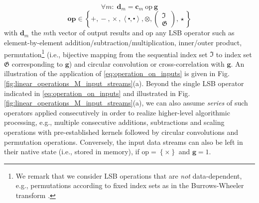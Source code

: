 \documentclass[twocolumn,english,onecolumn]{IEEEtran}
\theoremstyle{plain}
\theoremstyle{plain}
\begin{document}
\[
\forall m:\;\mathbf{d}_{m}=\mathbf{c}_{m}\:\text{op}\:\mathbf{g}
\]
\begin{equation}
\mathbf{\text{op}\in\left\{ +\mathrm{,}-\mathrm{,}\times\mathrm{,}\left\langle \centerdot,\centerdot\right\rangle ,\otimes\mathrm{,}\left(\begin{array}{c}
\mathfrak{I}\\
\mathfrak{G}
\end{array}\right)\mathrm{,}\star\right\} }\label{eq:operation_on_inputs}
\end{equation}
with $\mathbf{d}_{m}$ the $m$th vector of output results and $\text{op}$
any LSB operator such as element-by-element addition/subtraction/multiplication,
inner/outer product, permutation\footnote{We remark that we consider LSB operations that are \emph{not} data-dependent,
e.g., permutations according to fixed index sets as in the Burrows-Wheeler
transform \cite{fenwick1996burrows,ko2007parameterized}. } (i.e., bijective mapping from the sequential index set $\mathbf{\mathfrak{I}}$
to index set $\mathbf{\mathfrak{G}}$ corresponding to $\mathbf{g}$)
and circular convolution or cross-correlation with $\mathbf{g}$.
An illustration of the application of \eqref{eq:operation_on_inputs}
is given in Fig. \ref{fig:linear_operations_M_input_streams}(a).
Beyond the single LSB operator indicated in \eqref{eq:operation_on_inputs}
and illustrated in Fig. \ref{fig:linear_operations_M_input_streams}(a),
we can also assume\emph{ series} of such operators applied consecutively
in order to realize higher-level algorithmic processing, e.g., multiple
consecutive additions, subtractions and scaling operations with pre-established
kernels followed by circular convolutions and permutation operations.
Conversely, the input data streams can also be left in their native
state (i.e., stored in memory), if $\text{op}=\left\{ \times\right\} $
and $\mathbf{g}=1$.

\begin{figure*}[tp]
\begin{centering}
\par\end{centering}

\protect\caption{(a) kernel $\mathbf{g}$ applied to $M$ streams of input integers
via LSB operator $\text{op}$; (b) corresponding application using
one checksum input stream for transient fault detection or fail-stop
failure recovery via ABFT. \label{fig:linear_operations_M_input_streams}}
\end{figure*}
\end{document}
